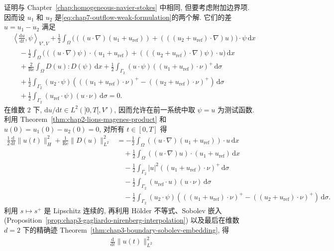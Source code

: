 \begin{sloppypar}
证明与 Chapter~\ref{chap:homogeneous-navier-stokes} 中相同, 但要考虑附加边界项. 因而设 $u_1$ 和 $u_2$ 是\eqref{eq:chap7-outflow-weak-formulation}的两个解. 它们的差 $u=u_1-u_2$ 满足
\[
\begin{aligned}
 &\left\langle\frac{\mathrm du}{\mathrm dt},\psi\right\rangle_{V',V}
 +\frac12\int_\Omega\bigl(((u\cdot\nabla)(u_1+u_{\mathrm{ref}}))
 +(((u_2+u_{\mathrm{ref}})\cdot\nabla)u)\bigr)\cdot\psi\,\mathrm dx\\
 &\quad-\frac12\int_\Omega\bigl(((u\cdot\nabla)\psi)\cdot(u_1+u_{\mathrm{ref}})
 +(((u_2+u_{\mathrm{ref}})\cdot\nabla)\psi)\cdot u\bigr)\,\mathrm dx\\
 &\quad+\frac2{\operatorname{Re}}\int_\Omega D(u):D(\psi)\,\mathrm dx
 +\frac12\int_{\Gamma_2}(u\cdot\psi)((u_1+u_{\mathrm{ref}})\cdot\nu)^+\,\mathrm d\sigma\\
 &\quad+\frac12\int_{\Gamma_2}(u_2\cdot\psi)
 \left(((u_1+u_{\mathrm{ref}})\cdot\nu)^+
 -((u_2+u_{\mathrm{ref}})\cdot\nu)^+\right)\,\mathrm d\sigma\\
 &\quad+\frac12\int_{\Gamma_2}(u_{\mathrm{ref}}\cdot\psi)(u\cdot\nu)\,\mathrm d\sigma=0.
\end{aligned}
\]
在维数 $2$ 下, $\mathrm du/\mathrm dt\in L^2(]0,T[,V')$, 因而允许在前一系统中取 $\psi=u$ 为测试函数. 利用 Theorem~\ref{thm:chap2-lions-magenes-product} 和 $u(0)=u_1(0)-u_2(0)=0$, 对所有 $t\in[0,T]$ 得
\[
\begin{aligned}
 \frac12\frac{\mathrm d}{\mathrm dt}\|u(t)\|_H^2
 +\frac1{\operatorname{Re}}\|D(u)\|_{L^2}^2
 &=-\frac12\int_\Omega((u\cdot\nabla)(u_1+u_{\mathrm{ref}}))\cdot u\,\mathrm dx\\
 &\quad+\frac12\int_\Omega((u\cdot\nabla)u)\cdot(u_1+u_{\mathrm{ref}})\,\mathrm dx\\
 &\quad-\frac12\int_{\Gamma_2}|u|^2((u_1+u_{\mathrm{ref}})\cdot\nu)^+\,\mathrm d\sigma\\
 &\quad-\frac12\int_{\Gamma_2}(u_{\mathrm{ref}}\cdot u)(u\cdot\nu)\,\mathrm d\sigma\\
 &\quad-\frac12\int_{\Gamma_2}(u_2\cdot\psi)
 \left(((u_1+u_{\mathrm{ref}})\cdot\nu)^+
 -((u_2+u_{\mathrm{ref}})\cdot\nu)^+\right)\,\mathrm d\sigma.
\end{aligned}
\]
利用 $s\mapsto s^+$ 是 Lipschitz 连续的, 再利用 H\"older 不等式、Sobolev 嵌入 (Proposition~\ref{prop:chap3-gagliardo-nirenberg-interpolation}) 以及最后在维数 $d=2$ 下的精确迹 Theorem~\ref{thm:chap3-boundary-sobolev-embedding}, 得
\[
\begin{aligned}
 &\frac{\mathrm d}{\mathrm dt}\|u(t)\|_{L^2}^2

\end{aligned}\]
\end{sloppypar}
